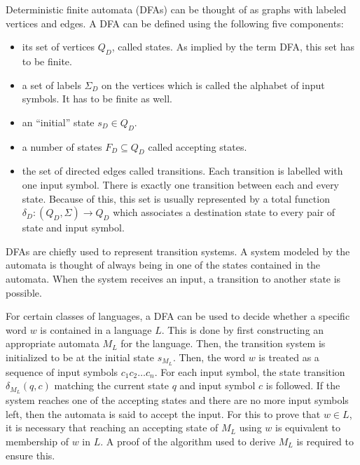 \begin{definition}
    Deterministic finite automata (DFAs) can be thought of as graphs with labeled vertices and edges.
    A DFA can be defined using the following five components:

    \begin{itemize}
        \item its set of vertices $Q_D$, called states. As implied by the term DFA, this set has to be finite.
        \item a set of labels $\Sigma_D$ on the vertices which is called the alphabet of input symbols.
                It has to be finite as well.
        \item an ``initial'' state $s_D \in Q_D$.
        \item a number of states $F_D \subseteq Q_D$ called accepting states.
        \item the set of directed edges called transitions.
                Each transition is labelled with one input symbol.
                There is exactly one transition between each and every state.
                Because of this, this set is usually represented by a total function $\delta_D : (Q_D, \Sigma) \rightarrow Q_D$ which
                associates a destination state to every pair of state and input symbol.
    \end{itemize}
\end{definition}

DFAs are chiefly used to represent transition systems.
A system modeled by the automata is thought of always being in one of the states contained in the automata.
When the system receives an input, a transition to another state is possible.

For certain classes of languages, a DFA can be used to decide whether a specific word $w$ is contained in a language $L$.
This is done by first constructing an appropriate automata $M_L$ for the language.
Then, the transition system is initialized to be at the initial state $s_{M_L}$.
Then, the word $w$ is treated as a sequence of input symbols $c_1 c_2 \ldots c_n$.
For each input symbol, the state transition $\delta_{M_L}(q, c)$ matching the current state $q$ and input symbol $c$ is followed.
If the system reaches one of the accepting states and there are no more input symbols left, then the
automata is said to accept the input.
For this to prove that $w \in L$, it is necessary that reaching an accepting state of $M_L$ using $w$ is equivalent to membership of $w$ in $L$.
A proof of the algorithm used to derive $M_L$ is required to ensure this.

